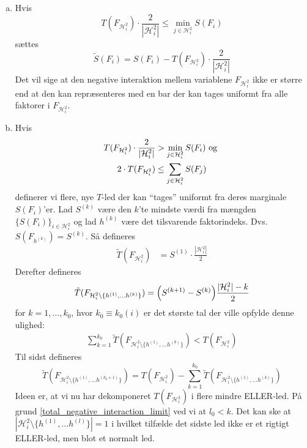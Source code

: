 \documentclass[a4paper, 12pt]{memoir}
\begin{document}
\begin{enumerate}[(i)]
\begin{enumerate}[a.]
\item
Hvis 
\begin{equation}
T(F_{\mathcal H_i^2})\cdot \frac{2}{|\mathcal H_i^2|}\leq \min_{j\in \mathcal H_i^2}S(F_i)
\end{equation}
sættes 
\begin{equation}
\tilde S(F_i) =S(F_i)- T(F_{\mathcal H_i^2})\cdot \frac{2}{|\mathcal H_i^2|}
\end{equation}
Det vil sige at den negative interaktion mellem variablene $F_{\mathcal H_i^2}$ ikke er større end at den kan repræsenteres med en bar der kan tages uniformt fra alle faktorer i $F_{\mathcal H_i^2}$. 
\item
Hvis 
\begin{gather}
T(F_{\mathcal H_i^2})\cdot \frac{2}{|\mathcal H_i^2|}>\min_{j\in \mathcal H_i^2}S(F_i) \textup{ og }\\ 2\cdot T(F_{\mathcal H_i^2})\leq\sum_{j\in \mathcal H_i^2}S(F_j)\label{total_negative_interaction_limit}
\end{gather}
definerer vi flere, nye $T$-led der kan ``tages'' uniformt fra deres marginale $S(F_i)$'er. Lad $S^{(k)}$ være den $k$'te mindste værdi fra mængden $\{S(F_i)\}_{i\in \mathcal H_i^2}$ og lad $h^{(k)}$ være det tilsvarende faktorindeks. Dvs. $S(F_{h^{(k)}})=S^{(k)} $. Så defineres
\begin{align}
\tilde T(F_{\mathcal H_i^2})&=S^{(1)}\cdot \frac{|\mathcal H_i^2|}{2}\label{b_initS}
\end{align}
Derefter defineres 
\begin{equation}
\tilde T(F_{\mathcal H_i^2\setminus \{h^{(1)}, \dots h^{(k)}\}})=\Bigl(S^{(k+1)}-S^{(k)}\Bigr)\frac{|\mathcal H_i^2|-k}{2} \label{b_S}
\end{equation}
for $k=1, \dots, k_0$, hvor $k_0\equiv k_0(i)$ er det største tal der ville opfylde denne ulighed:
\begin{align}
\sum_{k=1}^{k_0}\tilde T(F_{\mathcal H_i^2\setminus \{h^{(1)}, \dots h^{(k)}\}})< T(F_{\mathcal H_i^2})\label{k0b}
\end{align}
Til sidst defineres 
\begin{equation}
\tilde T(F_{\mathcal H_i^2\setminus \{h^{(1)}, \dots h^{(k_0+1)}\}})=T(F_{\mathcal H_i^2})-\sum_{k=1}^{k_0}\tilde T(F_{\mathcal H_i^2\setminus \{h^{(1)}, \dots h^{(k)}\}})\label{T_decomp_final_term}
\end{equation}
Ideen er, at vi nu har dekomponeret $T(F_{\mathcal H_i^2})$ i flere mindre ELLER-led. På grund \eqref{total_negative_interaction_limit} ved vi at $l_0< k$. Det kan ske at $|\mathcal H_i^2\setminus \{h^{(1)}, \dots h^{(l)}\}|=1$ i hvilket tilfælde det sidste led ikke er et rigtigt ELLER-led, men blot et normalt led.

\end{enumerate}
\end{enumerate}
\end{document}
